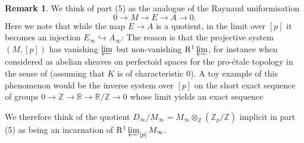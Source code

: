 \documentclass[10pt,oneside]{amsart}
\theoremstyle{definition}
\newtheorem{remark}[theorem]{Remark}
\newcommand{\Z}{\mathbb{Z}}
\begin{document}
	\begin{remark}
	We think of part (5) as the analogue of the Raynaud uniformisation
		\[0\to M\to E\to A\to 0.\]
	Here we note that while the map $E\to A$ is a quotient, in the limit over $[p]$ it becomes an injection $E_\infty\hookrightarrow A_\infty$: The reason is that the projective system $(M,[p])$ has vanishing $\varprojlim$ but non-vanishing $\mathrm{R}^1\varprojlim$, for instance when considered as abelian sheaves on perfectoid spaces for the pro-\'etale topology in the sense of \cite{etale_cohomology_of_diamonds} (assuming that $K$ is of characteristic $0$). A toy example of this phenomenon would be the inverse system over $[p]$ on the short exact sequence of groups 
	$0 \to\mathbb Z \to\mathbb R \to \mathbb R/\mathbb Z \to 0$
	whose limit yields an exact sequence
	\begin{center}
	\end{center}
	We therefore think of the quotient $D_\infty/M_\infty=M_\infty\otimes_{\Z}(\Z_p/\Z)$ implicit in part (5) as being an incarnation of $\mathrm{R}^1\varprojlim_{[p]}M_\infty$.
\end{remark}
\end{document}
